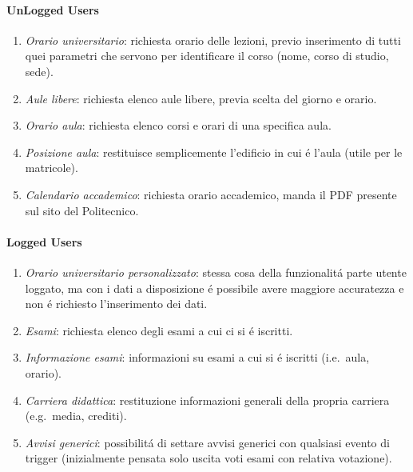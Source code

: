 \documentclass[]{article}
\begin{document}
\paragraph{UnLogged Users}
\begin{enumerate}
\item \textit{Orario universitario}: richiesta orario delle lezioni, previo inserimento di tutti quei parametri che servono per identificare il corso (nome, corso di studio, sede).
\item \textit{Aule libere}: richiesta elenco aule libere, previa scelta del giorno e orario.
\item \textit{Orario aula}: richiesta elenco corsi e orari di una specifica aula.
\item \textit{Posizione aula}: restituisce semplicemente l'edificio in cui é l'aula (utile per le matricole).
\item \textit{Calendario accademico}: richiesta orario accademico, manda il PDF presente sul sito del Politecnico.
\end{enumerate}

\paragraph{Logged Users}
\begin{enumerate}
\item \textit{Orario universitario personalizzato}: stessa cosa della funzionalitá parte utente loggato, ma con i dati a disposizione é possibile avere maggiore accuratezza e non é richiesto l'inserimento dei dati.
\item \textit{Esami}: richiesta elenco degli esami a cui ci si é iscritti.
\item \textit{Informazione esami}: informazioni su esami a cui si é iscritti (i.e.\ aula, orario).
\item \textit{Carriera didattica}: restituzione informazioni generali della propria carriera (e.g.\ media, crediti).
\item \textit{Avvisi generici}: possibilitá di settare avvisi generici con qualsiasi evento di trigger (inizialmente pensata solo uscita voti esami con relativa votazione).
\end{enumerate}
\end{document}
